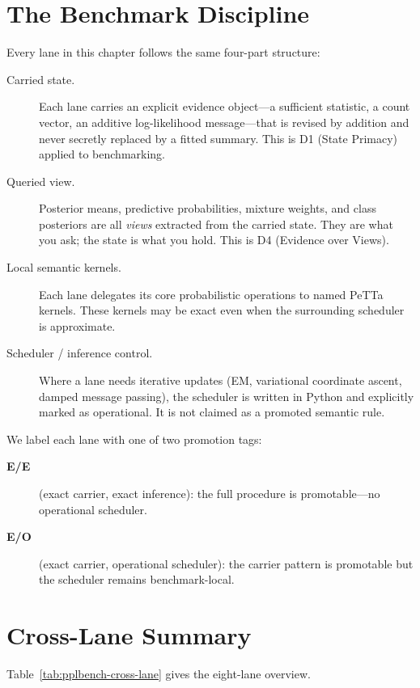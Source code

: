 \documentclass[11pt,openany]{report}
\begin{document}
\section{The Benchmark Discipline}

Every lane in this chapter follows the same four-part structure:

\begin{description}
\item[Carried state.]
  Each lane carries an explicit evidence object---a sufficient
  statistic, a count vector, an additive log-likelihood message---that
  is revised by addition and never secretly replaced by a fitted
  summary.  This is D1 (State Primacy) applied to benchmarking.

\item[Queried view.]
  Posterior means, predictive probabilities, mixture weights, and
  class posteriors are all \emph{views} extracted from the carried
  state.  They are what you ask; the state is what you hold.
  This is D4 (Evidence over Views).

\item[Local semantic kernels.]
  Each lane delegates its core probabilistic operations to named
  PeTTa kernels.  These kernels may be exact even when the
  surrounding scheduler is approximate.

\item[Scheduler / inference control.]
  Where a lane needs iterative updates (EM, variational coordinate
  ascent, damped message passing), the scheduler is written in Python
  and explicitly marked as operational.  It is not claimed as a
  promoted semantic rule.
\end{description}

\noindent
We label each lane with one of two promotion tags:
\begin{description}
\item[\textbf{E/E}] (exact carrier, exact inference):
  the full procedure is promotable---no operational scheduler.
\item[\textbf{E/O}] (exact carrier, operational scheduler):
  the carrier pattern is promotable but the scheduler remains
  benchmark-local.
\end{description}

\section{Cross-Lane Summary}

Table~\ref{tab:pplbench-cross-lane} gives the eight-lane overview.
\end{document}
